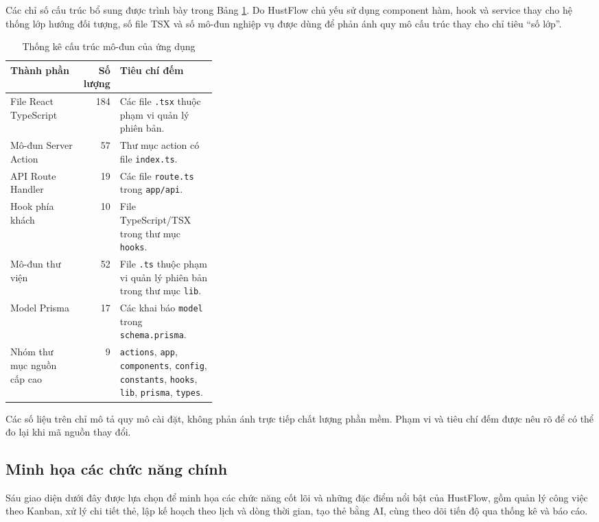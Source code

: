\documentclass[../DoAn.tex]{subfiles}
\begin{document}
Các chỉ số cấu trúc bổ sung được trình bày trong Bảng \ref{table:chapter4_structure_stats}. Do HustFlow chủ yếu sử dụng component hàm, hook và service thay cho hệ thống lớp hướng đối tượng, số file TSX và số mô-đun nghiệp vụ được dùng để phản ánh quy mô cấu trúc thay cho chỉ tiêu ``số lớp''.

\begin{table}[H]
    \centering
    \caption{Thống kê cấu trúc mô-đun của ứng dụng}
    \label{table:chapter4_structure_stats}
    \begin{tabularx}{\linewidth}{|p{0.35\linewidth}|r|X|}
        \hline
        \textbf{Thành phần} & \textbf{Số lượng} & \textbf{Tiêu chí đếm} \\ \hline
        File React TypeScript & 184 & Các file \texttt{.tsx} thuộc phạm vi quản lý phiên bản. \\ \hline
        Mô-đun Server Action & 57 & Thư mục action có file \texttt{index.ts}. \\ \hline
        API Route Handler & 19 & Các file \texttt{route.ts} trong \texttt{app/api}. \\ \hline
        Hook phía khách & 10 & File TypeScript/TSX trong thư mục \texttt{hooks}. \\ \hline
        Mô-đun thư viện & 52 & File \texttt{.ts} thuộc phạm vi quản lý phiên bản trong thư mục \texttt{lib}. \\ \hline
        Model Prisma & 17 & Các khai báo \texttt{model} trong \texttt{schema.prisma}. \\ \hline
        Nhóm thư mục nguồn cấp cao & 9 & \texttt{actions}, \texttt{app}, \texttt{components}, \texttt{config}, \texttt{constants}, \texttt{hooks}, \texttt{lib}, \texttt{prisma}, \texttt{types}. \\ \hline
    \end{tabularx}
\end{table}

Các số liệu trên chỉ mô tả quy mô cài đặt, không phản ánh trực tiếp chất lượng phần mềm. Phạm vi và tiêu chí đếm được nêu rõ để có thể đo lại khi mã nguồn thay đổi.

\subsection{Minh họa các chức năng chính}
\label{subsection:4.3.3}

Sáu giao diện dưới đây được lựa chọn để minh họa các chức năng cốt lõi và những đặc điểm nổi bật của HustFlow, gồm quản lý công việc theo Kanban, xử lý chi tiết thẻ, lập kế hoạch theo lịch và dòng thời gian, tạo thẻ bằng AI, cùng theo dõi tiến độ qua thống kê và báo cáo.
\end{document}
